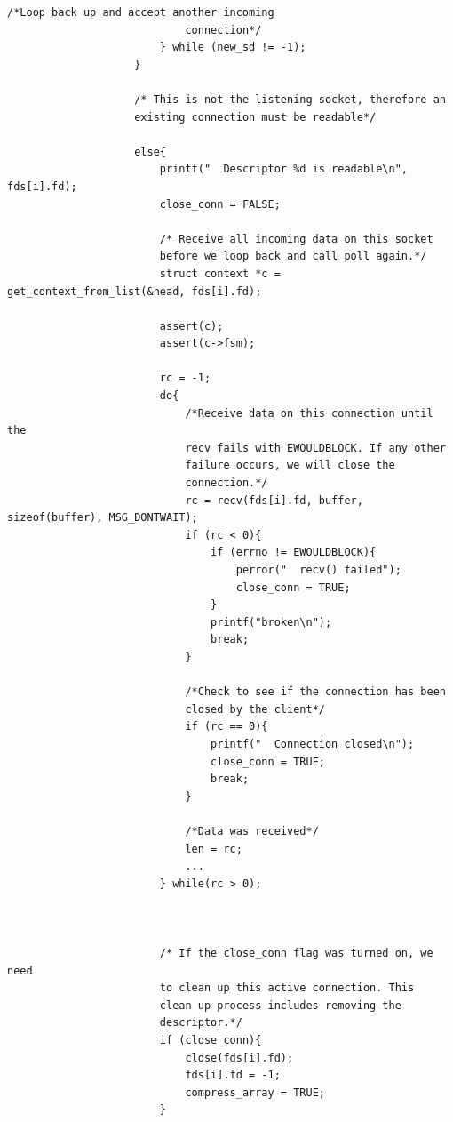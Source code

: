 \begin{lstlisting}[caption={Логика работы рабочего процесса},label=lst:pseudoworker]
                            /*Loop back up and accept another incoming
                            connection*/
                        } while (new_sd != -1);
                    }

                    /* This is not the listening socket, therefore an
                    existing connection must be readable*/

                    else{
                        printf("  Descriptor %d is readable\n", fds[i].fd);
                        close_conn = FALSE;

                        /* Receive all incoming data on this socket
                        before we loop back and call poll again.*/
                        struct context *c = get_context_from_list(&head, fds[i].fd);
                        
                        assert(c);
                        assert(c->fsm);

                        rc = -1;
                        do{
                            /*Receive data on this connection until the
                            recv fails with EWOULDBLOCK. If any other
                            failure occurs, we will close the
                            connection.*/
                            rc = recv(fds[i].fd, buffer, sizeof(buffer), MSG_DONTWAIT);
                            if (rc < 0){
                                if (errno != EWOULDBLOCK){
                                    perror("  recv() failed");
                                    close_conn = TRUE;
                                }
                                printf("broken\n");
                                break;
                            }

                            /*Check to see if the connection has been
                            closed by the client*/
                            if (rc == 0){
                                printf("  Connection closed\n");
                                close_conn = TRUE;
                                break;
                            }

                            /*Data was received*/
                            len = rc;
                            ...
                        } while(rc > 0);

                        
                        
                        /* If the close_conn flag was turned on, we need
                        to clean up this active connection. This
                        clean up process includes removing the
                        descriptor.*/
                        if (close_conn){
                            close(fds[i].fd);
                            fds[i].fd = -1;
                            compress_array = TRUE;
                        }



\end{lstlisting}
